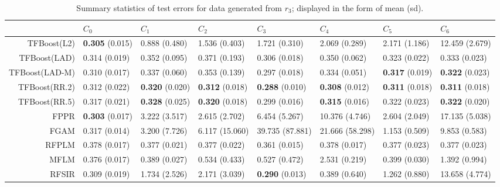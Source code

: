 \begin{table}[H]
\footnotesize
\centering
\begin{tabular}{rlllllll}
  \hline
 & $C_0$ & $C_1$ & $C_2$ & $C_3$ & $C_4$ & $C_5$ & $C_6$ \\ 
  \hline
TFBoost(L2) & \textbf{0.305} (0.015) & 0.888 (0.480) & 1.536 (0.403) & 1.721 (0.310) & 2.069 (0.289) & 2.171 (1.186) & 12.459 (2.679) \\ 
  TFBoost(LAD) & 0.314 (0.019) & 0.352 (0.095) & 0.371 (0.193) & 0.306 (0.018) & 0.350 (0.062) & 0.323 (0.022) & 0.333 (0.023) \\ 
  TFBoost(LAD-M) & 0.310 (0.017) & 0.337 (0.060) & 0.353 (0.139) & 0.297 (0.018) & 0.334 (0.051) & \textbf{0.317} (0.019) & \textbf{0.322} (0.023) \\ 
  TFBoost(RR.2) & 0.312 (0.022) & \textbf{0.320} (0.020) & \textbf{0.312} (0.018) & \textbf{0.288} (0.010) & \textbf{0.308} (0.012) & \textbf{0.311} (0.018) & \textbf{0.311} (0.018) \\ 
  TFBoost(RR.5) & 0.317 (0.021) & \textbf{0.328} (0.025) & \textbf{0.320} (0.018) & 0.299 (0.016) & \textbf{0.315} (0.016) & 0.322 (0.023) & \textbf{0.322} (0.020) \\ 
  FPPR & \textbf{0.303} (0.017) & 3.222 (3.517) & 2.615 (2.702) & 6.454 (5.267) & 10.376 (4.746) & 2.604 (2.049) & 17.135 (5.038) \\ 
  FGAM & 0.317 (0.014) & 3.200 (7.726) & 6.117 (15.060) & 39.735 (87.881) & 21.666 (58.298) & 1.153 (0.509) & 9.853 (0.583) \\ 
  RFPLM & 0.378 (0.017) & 0.377 (0.021) & 0.377 (0.022) & 0.361 (0.015) & 0.378 (0.017) & 0.377 (0.023) & 0.377 (0.023) \\ 
  MFLM & 0.376 (0.017) & 0.389 (0.027) & 0.534 (0.433) & 0.527 (0.472) & 2.531 (0.219) & 0.399 (0.030) & 1.392 (0.994) \\ 
  RFSIR & 0.309 (0.019) & 1.734 (2.526) & 2.171 (3.039) & \textbf{0.290} (0.013) & 0.389 (0.640) & 1.262 (0.880) & 13.658 (4.774) \\ 
   \hline
\end{tabular}
\caption{Summary statistics of test errors for data generated from $r_3$; displayed in the form of mean (sd).} 
\end{table}
